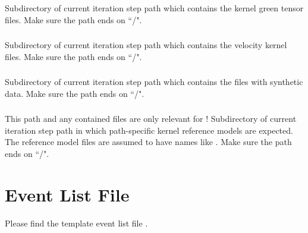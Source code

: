\subsubsection{} 
Subdirectory of current iteration step path
 which contains the 
kernel green tensor files. Make sure the path ends on ``/".
\subsubsection{} 
Subdirectory of current iteration step path
 which contains the 
velocity kernel files. Make sure the path ends on ``/".
\subsubsection{} 
Subdirectory of current iteration step path
 which contains the 
files with synthetic data. Make sure the path ends on ``/".
\subsubsection{} 
This path and any contained files are only relevant for !
Subdirectory of current iteration step path
 in which path-specific kernel reference models are expected.
The reference model files are assumed to have names like .
Make sure the path ends on ``/".

%
\section{Event List File} \label{files,sec:event_list}
%
Please find the template event list file .


